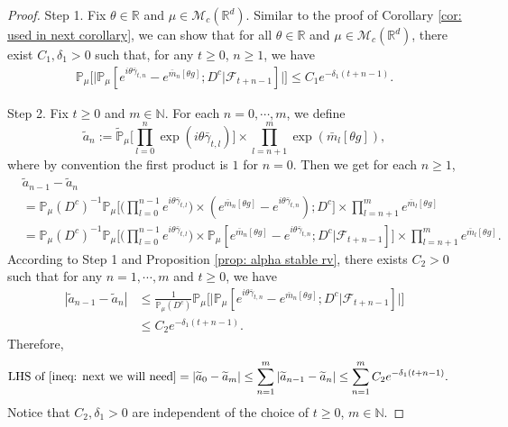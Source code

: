\documentclass[12pt,a4paper]{amsart}
\theoremstyle{plain}
\theoremstyle{definition}
\numberwithin{equation}{section}
\begin{document}
\begin{proof}
    Step 1. Fix $\theta \in \mathbb R$ and $\mu \in \mathcal M_c(\mathbb R^d)$.
    Similar to the proof of Corollary \ref{cor: used in next corollary}, we can show that  for all $\theta\in \mathbb{R}$ and $\mu\in \mathcal{M}_c(\mathbb{R}^d)$, there exist $C_1,\delta_1>0$ such that, for any $t\geq 0$, $n\geq 1$, we have
\begin{align}
    \mathbb{P}_{\mu}\Big[\big|\mathbb{P}_{\mu}[e^{i\theta\bar{\gamma}_{t,n}}-e^{\bar{m}_n[\theta g]}; D^c | \mathscr F_{t+n-1}]\big|\Big]\leq C_1e^{-\delta_1(t+n-1)}.
\end{align}

    Step 2.
    Fix $t\geq 0$ and $m\in \mathbb{N}$.
    For each $n=0,\cdots,m$, we define
\[
    \widetilde{a}_n
    :=\mathbb{\widetilde{P}}_{\mu}\Big[\prod_{l=0}^{n}\exp(i\theta\bar{\gamma}_{t,l})\Big] \times \prod_{l=n+1}^{m}\exp(\bar{m}_l[\theta g]),
\]
    where by convention the first product is $1$ for $n=0$. Then we get for each $n \ge 1$,
\begin{align}
    &\widetilde{a}_{n-1} - \widetilde{a}_n
    \\&=\mathbb{P}_{\mu}(D^c)^{-1}\mathbb{P}_{\mu}\Big[\Big(\prod_{l=0}^{n-1}e^{i\theta\bar{\gamma}_{t,l}}\Big)\times (e^{\bar{m}_n[\theta g]}-e^{i\theta \bar{\gamma}_{t,n}});D^c\Big] \times \prod_{l=n+1}^{m}e^{\bar{m}_l[\theta g]}
    \\&=\mathbb{P}_{\mu}(D^c)^{-1}\mathbb{P}_{\mu}\Big[\Big(\prod_{l=0}^{n-1}e^{i\theta\bar{\gamma}_{t,l}}\Big)\times \mathbb{P}_{\mu}[e^{\bar{m}_n[\theta g]}-e^{i\theta \bar{\gamma}_{t,n}};D^c|\mathscr{F}_{t+n-1}]\Big]\times \prod_{l=n+1}^{m}e^{\bar{m}_l[\theta g]}.
\end{align}
    According to Step 1 and Proposition \ref{prop: alpha stable rv}, there exists $C_2>0$ such that for any $n=1,\cdots, m$ and $t\geq 0$, we have
\begin{align}
    |\widetilde{a}_{n-1}- \widetilde{a}_n|
    &\leq \frac{1}{\mathbb{P}_{\mu}(D^c)}\mathbb{P}_{\mu}\Big[\big|\mathbb P_\mu[e^{i\theta\bar{\gamma}_{t,n}}-e^{\bar{m}_n[\theta g]}; D^c\big|\mathscr{F}_{t+n-1}]\big|\Big]
    \\& \leq C_2 e^{-\delta_1(t+n-1)}.
\end{align}
    Therefore,
\begin{align}
    \text{LHS of \eqref{ineq: next we will need}}
    &= \left|\widetilde{a}_{0}-\widetilde{a}_m\right|
    \leq\sum_{n=1}^m\left|\widetilde{a}_{n-1}-\widetilde{a}_n\right|
    \leq \sum_{n=1}^m C_2 e^{-\delta_1(t+n-1)}.
\end{align}
	Notice that $C_2, \delta_1>0$ are independent of the choice of $t\geq 0$, $m\in \mathbb{N}$.
\end{proof}
\end{document}

